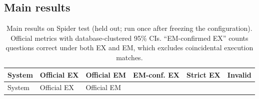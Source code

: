 \documentclass[
  10pt,
]{article}
\begin{document}
\subsection{Main results}\label{main-results}

\begin{longtable}[]{@{}
  >{\raggedright\arraybackslash}p{}
  >{\raggedleft\arraybackslash}p{}
  >{\raggedleft\arraybackslash}p{}
  >{\raggedleft\arraybackslash}p{}
  >{\raggedleft\arraybackslash}p{}
  >{\raggedleft\arraybackslash}p{}@{}}
\caption{Main results on Spider test (held out; run once after freezing
the configuration). Official metrics with database-clustered 95\% CIs.
``EM-confirmed EX'' counts questions correct under both EX and EM, which
excludes coincidental execution matches.}\tabularnewline
\toprule\noalign{}
\begin{minipage}[b]{\linewidth}\raggedright
System
\end{minipage} & \begin{minipage}[b]{\linewidth}\raggedleft
Official EX
\end{minipage} & \begin{minipage}[b]{\linewidth}\raggedleft
Official EM
\end{minipage} & \begin{minipage}[b]{\linewidth}\raggedleft
EM-conf. EX
\end{minipage} & \begin{minipage}[b]{\linewidth}\raggedleft
Strict EX
\end{minipage} & \begin{minipage}[b]{\linewidth}\raggedleft
Invalid
\end{minipage} \\
\midrule\noalign{}
\endfirsthead
\toprule\noalign{}
\begin{minipage}[b]{\linewidth}\raggedright
System
\end{minipage} & \begin{minipage}[b]{\linewidth}\raggedleft
Official EX
\end{minipage} & \begin{minipage}[b]{\linewidth}\raggedleft
Official EM
\end{minipage} & \begin{minipage}[b]{\linewidth}\raggedleft

\end{minipage}
\end{longtable}
\end{document}
